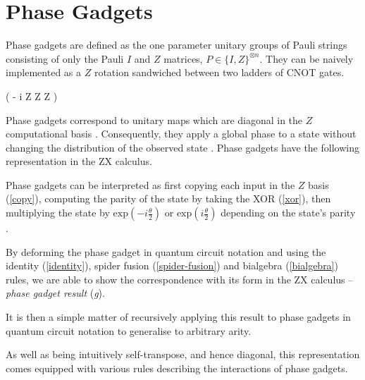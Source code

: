 \section{Phase Gadgets}
Phase gadgets are defined as the one parameter unitary groups of Pauli strings consisting of only the Pauli $I$ and $Z$ matrices, $P \in \{I, Z\}^{\otimes n}$. They can be naively implemented as a $Z$ rotation sandwiched between two ladders of CNOT gates.

{ \left( - i  Z \otimes Z \otimes Z \right)}

Phase gadgets correspond to unitary maps which are diagonal in the $Z$ computational basis \cite{Cowtan2020}. Consequently, they apply a global phase to a state without changing the distribution of the observed state \cite{Yeung2020}. Phase gadgets have the following representation in the ZX calculus.


Phase gadgets can be interpreted as first copying each input in the $Z$ basis (\ref{copy}), computing the parity of the state by taking the XOR (\ref{xor}), then multiplying the state by $\text{exp} \left(-i\frac{\theta}{2} \right)$ or $\text{exp} \left(i\frac{\theta}{2} \right)$ depending on the state's parity \cite{Yeung2020}.

By deforming the phase gadget in quantum circuit notation and using the identity (\ref{identity}), spider fusion (\ref{spider-fusion}) and bialgebra (\ref{bialgebra}) rules, we are able to show the correspondence with its form in the ZX calculus -- \textit{phase gadget result} (\textit{g}).


It is then a simple matter of recursively applying this result to phase gadgets in quantum circuit notation to generalise to arbitrary arity.

%
\label{phase-gadget-proof}

As well as being intuitively self-transpose, and hence diagonal, this representation comes equipped with various rules describing the interactions of phase gadgets. 

